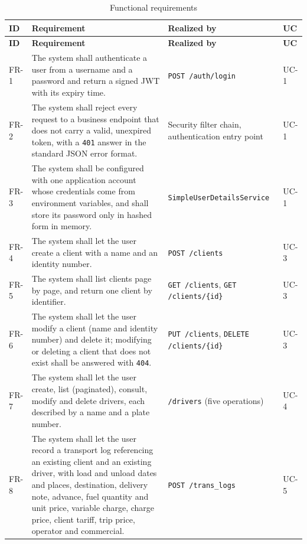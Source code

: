 {
\renewcommand{\arraystretch}{1.05}
\footnotesize
\begin{longtable}{@{}p{1.1cm}>{\raggedright\arraybackslash}p{7.4cm}>{\raggedright\arraybackslash}p{4.2cm}p{1.5cm}@{}}
\caption{Functional requirements}\label{tab:fr}\\
\toprule
\textbf{ID} & \textbf{Requirement} & \textbf{Realized by} & \textbf{UC} \\
\midrule
\endfirsthead
\toprule
\textbf{ID} & \textbf{Requirement} & \textbf{Realized by} & \textbf{UC} \\
\midrule
\endhead
\bottomrule
\endfoot
FR-1 & The system shall authenticate a user from a username and a password and return a signed JWT with its expiry time. & \texttt{POST /auth/login} & UC-1 \\
FR-2 & The system shall reject every request to a business endpoint that does not carry a valid, unexpired token, with a \texttt{401} answer in the standard JSON error format. & Security filter chain, authentication entry point & UC-1 \\
FR-3 & The system shall be configured with one application account whose credentials come from environment variables, and shall store its password only in hashed form in memory. & \texttt{Simple\-User\-Details\-Service} & UC-1 \\
FR-4 & The system shall let the user create a client with a name and an identity number. & \texttt{POST /clients} & UC-3 \\
FR-5 & The system shall list clients page by page, and return one client by identifier. & \texttt{GET /clients}, \texttt{GET /clients/\{id\}} & UC-3 \\
FR-6 & The system shall let the user modify a client (name and identity number) and delete it; modifying or deleting a client that does not exist shall be answered with \texttt{404}. & \texttt{PUT /clients}, \texttt{DELETE /clients/\{id\}} & UC-3 \\
FR-7 & The system shall let the user create, list (paginated), consult, modify and delete drivers, each described by a name and a plate number. & \texttt{/drivers} (five operations) & UC-4 \\
FR-8 & The system shall let the user record a transport log referencing an existing client and an existing driver, with load and unload dates and places, destination, delivery note, advance, fuel quantity and unit price, variable charge, charge price, client tariff, trip price, operator and commercial. & \texttt{POST /trans\_logs} & UC-5 \\

\end{longtable}}
